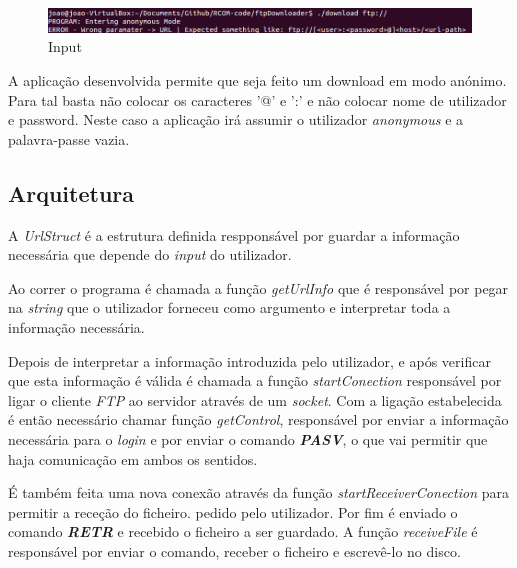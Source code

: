 \documentclass[a4paper]{article}
\begin{document}
	\begin{figure}[H]
  	\includegraphics[width=\linewidth]{consoleScreenshot1.png}
  	\caption{Input}
  	\label{fig:input}
	\end{figure}

	A aplicação desenvolvida permite que seja feito um download em modo anónimo. Para tal basta não colocar os caracteres '@' e ':' e não colocar nome de utilizador e password. Neste caso a aplicação irá assumir o utilizador \textit{anonymous} e a palavra-passe vazia.

	\subsection{Arquitetura}

	A \textit{UrlStruct} é a estrutura definida respponsável por guardar a informação necessária que depende do \textit{input} do utilizador.

	
	\normalsize

	Ao correr o programa é chamada a função \textit{getUrlInfo} que é responsável por pegar na \textit{string} que o utilizador forneceu como argumento e interpretar toda a informação necessária.

	
	\normalsize

	Depois de interpretar a informação introduzida pelo utilizador, e após verificar que esta informação é válida é chamada a função \textit{startConection} responsável por ligar o cliente \textit{FTP} ao servidor através de um \textit{socket}. Com a ligação estabelecida é então necessário chamar função \textit{getControl}, responsável por enviar a informação necessária para o \textit{login} e por enviar o comando \textbf{\textit{PASV}}, o que vai permitir que haja comunicação em ambos os sentidos.

	
	\normalsize

	 É também feita uma nova conexão através da função \textit{startReceiverConection} para permitir a receção do ficheiro. pedido pelo utilizador. Por fim é enviado o comando \textbf{\textit{RETR}} e recebido o ficheiro a ser guardado. A função \textit{receiveFile} é responsável por enviar o comando, receber o ficheiro e escrevê-lo no disco.
\end{document}
